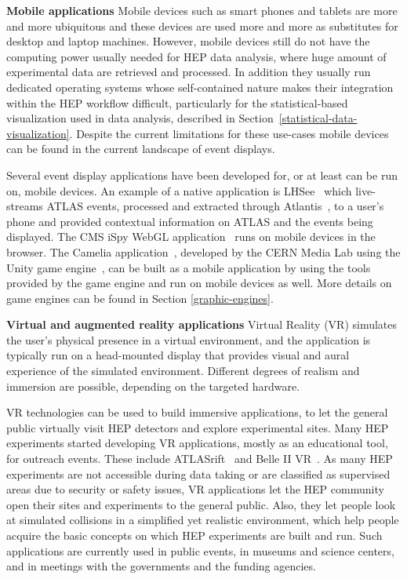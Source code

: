 \documentclass[12pt,a4paper]{article}
\begin{document}
{\bf Mobile applications} Mobile devices such as smart phones and tablets are more and more ubiquitous and these devices
are used more and more as substitutes for desktop and laptop machines.
However, mobile devices still do not have the computing power usually needed for HEP data analysis, where huge amount of experimental data
are retrieved and processed. In addition they usually run dedicated operating systems whose self-contained nature
makes their integration within the HEP workflow difficult, particularly for the statistical-based visualization used in
data analysis, described in Section~\ref{statistical-data-visualization}. Despite the current limitations for these use-cases mobile
devices can be found in the current landscape of event displays.

Several event display applications have been developed for, or at least can be run on, mobile devices.
An example of a native application is LHSee~\cite{LHSee} which live-streams ATLAS events, processed and extracted
through Atlantis~\cite{ATLASAtlantis},
to a user’s phone and provided contextual information on ATLAS and the
events being displayed. The CMS iSpy WebGL application~\cite{CMSISpyWebGL} runs on mobile devices in the browser.
The Camelia application~\cite{CERNCamelia}, %
developed by the CERN Media Lab using the Unity game engine~\cite{Unity3D}, can be built as a mobile application
by using the tools provided by the game engine and run on mobile devices as well.
More details on game engines can be found in Section \ref{graphic-engines}.

{\bf Virtual and augmented reality applications} Virtual Reality (VR) simulates the user’s physical presence in a virtual environment,
and the application is typically run on a head-mounted display that provides visual and aural experience of the simulated environment.
Different degrees of realism and immersion are possible, depending on the targeted hardware.

VR technologies can be used to build immersive applications, to let the general public virtually visit HEP detectors and explore
experimental sites. Many HEP experiments started developing VR applications, mostly as an educational tool, for outreach events.
These include ATLASrift~\cite{ATLASRift} and Belle II VR~\cite{BelleIIVR}.
As many HEP experiments are not accessible during data taking or are classified as supervised areas due to security or safety issues,
VR applications let the HEP community open their sites and experiments to the general public. Also,
they let people look at simulated  collisions in a simplified yet realistic environment, which help people acquire the basic
concepts on which HEP experiments are built and run. Such applications are currently used in public events,
in museums and science centers, and in meetings with the governments and the funding agencies.
\end{document}
